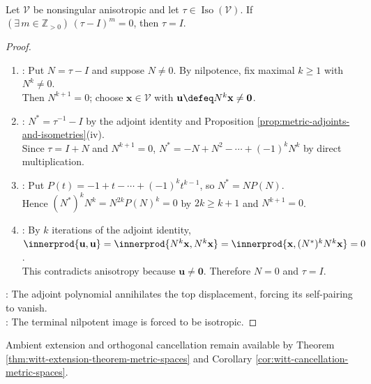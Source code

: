 \begin{proposition} \label{prop:anisotropic-space-has-no-nontrivial-unipotent-isometries} \\
Let $\mathcal{V}$ be nonsingular anisotropic and let $\tau\in\operatorname{Iso}(\mathcal{V})$. If $(\exists\,m\in\mathbb{Z}_{>0})\,(\tau-I)^m=0$, then $\tau=I$.
\begin{proof}
\begin{enumerate}[label=(\roman*)]
\setlength{\itemsep}{0pt}
\item {}: Put $N=\tau-I$ and suppose $N\neq0$. By nilpotence, fix maximal $k\geq1$ with $N^k\neq0$.\\
Then $N^{k+1}=0$; choose $\mathbf{x}\in\mathcal{V}$ with $\mathbf{u}\defeq N^k\mathbf{x}\neq\mathbf{0}$.
\item {}: $N^*=\tau^{-1}-I$ by the adjoint identity and Proposition \ref{prop:metric-adjoints-and-isometries}(iv).\\
Since $\tau=I+N$ and $N^{k+1}=0$, $N^*=-N+N^2-\cdots+(-1)^kN^k$ by direct multiplication.
\item {}: Put $P(t)=-1+t-\cdots+(-1)^kt^{k-1}$, so $N^*=NP(N)$.\\
Hence $(N^*)^kN^k=N^{2k}P(N)^k=0$ by $2k\geq k+1$ and $N^{k+1}=0$.
\item {}: By $k$ iterations of the adjoint identity, $\innerprod{\mathbf{u},\mathbf{u}}=\innerprod{N^k\mathbf{x},N^k\mathbf{x}}=\innerprod{\mathbf{x},(N^*)^kN^k\mathbf{x}}=0$.\\
This contradicts anisotropy because $\mathbf{u}\neq\mathbf{0}$. Therefore $N=0$ and $\tau=I$.
\end{enumerate}
: The adjoint polynomial annihilates the top displacement, forcing its self-pairing to vanish.\\
: The terminal nilpotent image is forced to be isotropic.
\end{proof}
\end{proposition}

Ambient extension and orthogonal cancellation remain available by Theorem \ref{thm:witt-extension-theorem-metric-spaces} and Corollary \ref{cor:witt-cancellation-metric-spaces}.
